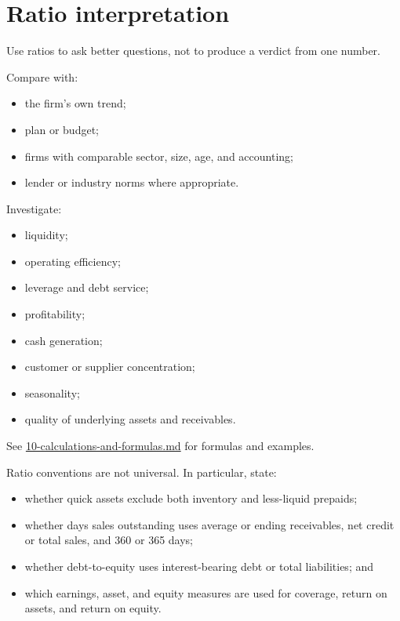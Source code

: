 \documentclass[11pt,letterpaper,oneside,openany]{book}
\begin{document}
\section[Ratio interpretation]{Ratio interpretation}
Use ratios to ask better questions, not to produce a verdict from one number.


Compare with:


\begin{itemize}
\item the firm's own trend;
\item plan or budget;
\item firms with comparable sector, size, age, and accounting;
\item lender or industry norms where appropriate.
\end{itemize}


Investigate:


\begin{itemize}
\item liquidity;
\item operating efficiency;
\item leverage and debt service;
\item profitability;
\item cash generation;
\item customer or supplier concentration;
\item seasonality;
\item quality of underlying assets and receivables.
\end{itemize}


See \hyperref[chap:calculations]{10-calculations-and-formulas.md} for formulas and examples.


Ratio conventions are not universal. In particular, state:


\begin{itemize}
\item whether quick assets exclude both inventory and less-liquid prepaids;
\item whether days sales outstanding uses average or ending receivables, net credit or total sales, and 360 or 365 days;
\item whether debt-to-equity uses interest-bearing debt or total liabilities; and
\item which earnings, asset, and equity measures are used for coverage, return on assets, and return on equity.
\end{itemize}


\end{document}
